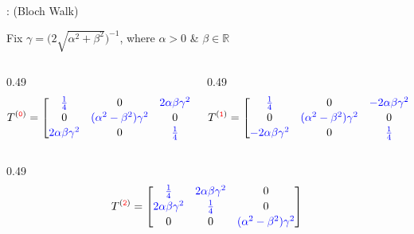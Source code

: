 \documentclass[aspectratio=169,11pt]{beamer}
\newcommand{\uw}[1]{\underline{\smash{#1}}}
\begin{document}
\begin{frame}
  \vspace{0.3em}
  \uw{Example}: (Bloch Walk)
  \vspace{0.2em}

  Fix $\gamma = \big(2\sqrt{\alpha^{2}+\beta^{2}}\big)^{-1}$, where
  $\alpha > 0$ \& $\beta \in \mathbb{R}$
  \vspace{-0.2em}
  \begin{columns}[c]
    \begin{column}{0.49\textwidth}
      {\small\[
        T^{({\color{red}\mathtt{0}})} = \left[\begin{array}{@{}ccc@{}}
          {\color{blue}\tfrac14} & 0 & {\color{blue}2\alpha\beta\gamma^{2}}\\[0.15em]
          0 & {\color{blue}(\alpha^{2}-\beta^{2})\gamma^{2}} & 0\\[0.15em]
          {\color{blue}2\alpha\beta\gamma^{2}} & 0 & {\color{blue}\tfrac14}
        \end{array}\right]
      \]}
    \end{column}
    \begin{column}{0.49\textwidth}
      {\small\[
        T^{({\color{red}\mathtt{1}})} = \left[\begin{array}{@{}ccc@{}}
          {\color{blue}\tfrac14} & 0 & {\color{blue}-2\alpha\beta\gamma^{2}}\\[0.15em]
          0 & {\color{blue}(\alpha^{2}-\beta^{2})\gamma^{2}} & 0\\[0.15em]
          {\color{blue}-2\alpha\beta\gamma^{2}} & 0 & {\color{blue}\tfrac14}
        \end{array}\right]
      \]}
    \end{column}
  \end{columns}
  \vspace{0.2em}
  \begin{columns}[c]
    \begin{column}{0.49\textwidth}
      {\small\[
        T^{({\color{red}\mathtt{2}})} = \left[\begin{array}{@{}ccc@{}}
          {\color{blue}\tfrac14} & {\color{blue}2\alpha\beta\gamma^{2}} & 0\\[0.15em]
          {\color{blue}2\alpha\beta\gamma^{2}} & {\color{blue}\tfrac14} & 0\\[0.15em]
          0 & 0 & {\color{blue}(\alpha^{2}-\beta^{2})\gamma^{2}}
        \end{array}\right]
\]}
\end{column}
\end{columns}
\end{frame}
\end{document}
